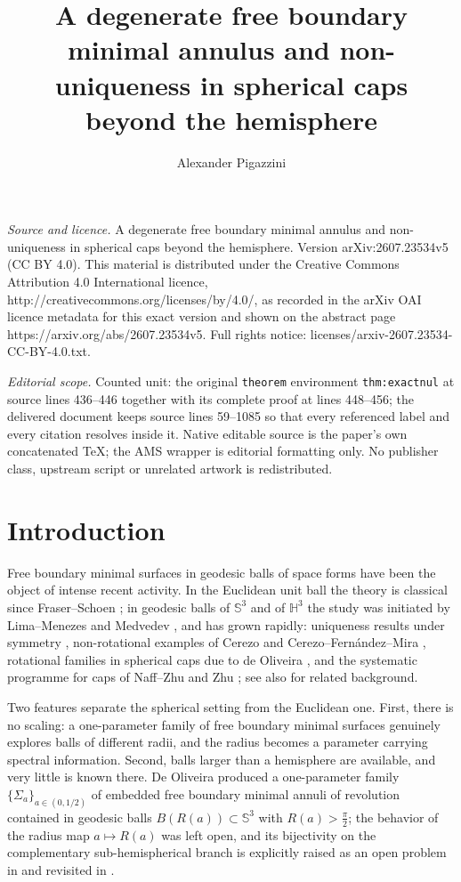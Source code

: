\documentclass[10pt,a4paper]{amsart}
\newcommand{\Sph}{\mathbb{S}}
\newcommand{\Hyp}{\mathbb{H}}
\begin{document}
\title[A degenerate free boundary minimal annulus and non-uniquenes]{A degenerate free boundary minimal annulus and non-uniqueness in spherical caps beyond the hemisphere}
\author{Alexander Pigazzini}
\date{}
\maketitle
\noindent\emph{Source and licence.} A degenerate free boundary minimal annulus and non-uniqueness in spherical caps beyond the hemisphere. Version arXiv:2607.23534v5 (CC BY 4.0). This material is distributed under the Creative Commons Attribution 4.0 International licence, http://creativecommons.org/licenses/by/4.0/, as recorded in the arXiv OAI licence metadata for this exact version and shown on the abstract page https://arxiv.org/abs/2607.23534v5. Full rights notice: licenses/arxiv-2607.23534-CC-BY-4.0.txt.\par\smallskip
\noindent\textit{Editorial scope.} Counted unit: the original \texttt{theorem} environment \texttt{thm:exactnul} at source lines 436--446 together with its complete proof at lines 448--456; the delivered document keeps source lines 59--1085 so that every referenced label and every citation resolves inside it. Native editable source is the paper's own concatenated TeX; the AMS wrapper is editorial formatting only. No publisher class, upstream script or unrelated artwork is redistributed.
\section{Introduction}\label{sec:intro}

Free boundary minimal surfaces in geodesic balls of space forms have been the object of intense recent activity. In the Euclidean unit ball the theory is classical since Fraser--Schoen \cite{FS16}; in geodesic balls of $\Sph^3$ and of $\Hyp^3$ the study was initiated by Lima--Menezes \cite{LM23} and Medvedev \cite{Med23}, and has grown rapidly: uniqueness results under symmetry \cite{Lim25}, non-rotational examples of Cerezo \cite{Cer25} and Cerezo--Fern\'andez--Mira \cite{CFM25}, rotational families in spherical caps due to de Oliveira \cite{dO24}, and the systematic programme for caps of Naff--Zhu \cite{NZ1} and Zhu \cite{NZ2}; see also \cite{NZhalf,FS15,FL14,KM} for related background.

Two features separate the spherical setting from the Euclidean one. First, there is no scaling: a one-parameter family of free boundary minimal surfaces genuinely explores balls of different radii, and the radius becomes a parameter carrying spectral information. Second, balls larger than a hemisphere are available, and very little is known there. De Oliveira \cite[Prop. 3.4]{dO24} produced a one-parameter family $\{\Sigma_a\}_{a\in(0,1/2)}$ of embedded free boundary minimal annuli of revolution contained in geodesic balls $B(R(a))\subset\Sph^3$ with $R(a)>\tfrac\pi2$; the behavior of the radius map $a\mapsto R(a)$ was left open, and its bijectivity on the complementary sub-hemispherical branch is explicitly raised as an open problem in \cite[Rem. 3.5]{dO24} and revisited in \cite[\S 6.1]{NZ1}.
\end{document}
